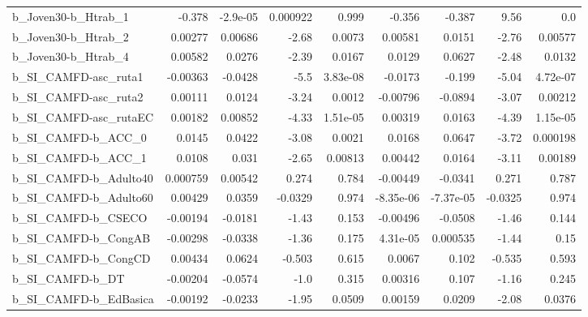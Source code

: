\begin{tabular}{lrrrrrrrr}
b\_Joven30-b\_Htrab\_1        &      -0.378 &     -2.9e-05 & 0.000922 &    0.999 &     -0.356 &      -0.387 &         9.56 &           0.0 \\
b\_Joven30-b\_Htrab\_2        &     0.00277 &      0.00686 &    -2.68 &   0.0073 &    0.00581 &      0.0151 &        -2.76 &       0.00577 \\
b\_Joven30-b\_Htrab\_4        &     0.00582 &       0.0276 &    -2.39 &   0.0167 &     0.0129 &      0.0627 &        -2.48 &        0.0132 \\
b\_SI\_CAMFD-asc\_ruta1       &    -0.00363 &      -0.0428 &     -5.5 & 3.83e-08 &    -0.0173 &      -0.199 &        -5.04 &      4.72e-07 \\
b\_SI\_CAMFD-asc\_ruta2       &     0.00111 &       0.0124 &    -3.24 &   0.0012 &   -0.00796 &     -0.0894 &        -3.07 &       0.00212 \\
b\_SI\_CAMFD-asc\_rutaEC      &     0.00182 &      0.00852 &    -4.33 & 1.51e-05 &    0.00319 &      0.0163 &        -4.39 &      1.15e-05 \\
b\_SI\_CAMFD-b\_ACC\_0         &      0.0145 &       0.0422 &    -3.08 &   0.0021 &     0.0168 &      0.0647 &        -3.72 &      0.000198 \\
b\_SI\_CAMFD-b\_ACC\_1         &      0.0108 &        0.031 &    -2.65 &  0.00813 &    0.00442 &      0.0164 &        -3.11 &       0.00189 \\
b\_SI\_CAMFD-b\_Adulto40      &    0.000759 &      0.00542 &    0.274 &    0.784 &   -0.00449 &     -0.0341 &        0.271 &         0.787 \\
b\_SI\_CAMFD-b\_Adulto60      &     0.00429 &       0.0359 &  -0.0329 &    0.974 &  -8.35e-06 &   -7.37e-05 &      -0.0325 &         0.974 \\
b\_SI\_CAMFD-b\_CSECO         &    -0.00194 &      -0.0181 &    -1.43 &    0.153 &   -0.00496 &     -0.0508 &        -1.46 &         0.144 \\
b\_SI\_CAMFD-b\_CongAB        &    -0.00298 &      -0.0338 &    -1.36 &    0.175 &   4.31e-05 &    0.000535 &        -1.44 &          0.15 \\
b\_SI\_CAMFD-b\_CongCD        &     0.00434 &       0.0624 &   -0.503 &    0.615 &     0.0067 &       0.102 &       -0.535 &         0.593 \\
b\_SI\_CAMFD-b\_DT            &    -0.00204 &      -0.0574 &     -1.0 &    0.315 &    0.00316 &       0.107 &        -1.16 &         0.245 \\
b\_SI\_CAMFD-b\_EdBasica      &    -0.00192 &      -0.0233 &    -1.95 &   0.0509 &    0.00159 &      0.0209 &        -2.08 &        0.0376 \\

\end{tabular}
